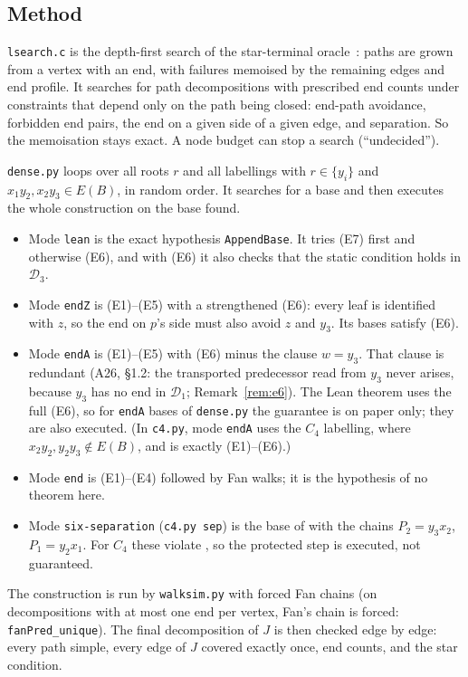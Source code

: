 \documentclass[11pt]{amsart}
\theoremstyle{definition}
\newcommand{\cD}{\mathcal D}
\begin{document}
\subsection*{Method}
\texttt{lsearch.c} is the depth-first search of the star-terminal oracle~\cite{STL,TM}: paths are
grown from a vertex with an end, with failures memoised by the remaining edges and end profile.
It searches for path decompositions with prescribed end counts under constraints that depend only
on the path being closed: end-path avoidance, forbidden end pairs, the end on a given side of a
given edge, and separation. So the memoisation stays exact. A node budget can stop a search
(``undecided'').

\texttt{dense.py} loops over all roots $r$ and all labellings with $r\in\{y_i\}$ and
$x_1y_2,x_2y_3\in E(B)$, in random order. It searches for a base and then executes the whole
construction on the base found.
\begin{itemize}
\item Mode \texttt{lean} is the exact hypothesis \texttt{AppendBase}. It tries (E7) first and
otherwise (E6), and with (E6) it also checks that the static condition holds in $\cD_3$.
\item Mode \texttt{endZ} is (E1)--(E5) with a strengthened (E6): every leaf is identified with
$z$, so the end on $p$'s side must also avoid $z$ and $y_3$. Its bases satisfy (E6).
\item Mode \texttt{endA} is (E1)--(E5) with (E6) minus the clause $w=y_3$. That clause is
redundant (A26, \S1.2: the transported predecessor read from $y_3$ never arises, because $y_3$ has
no end in $\cD_1$; Remark~\ref{rem:e6}). The Lean theorem uses the full (E6), so for
\texttt{endA} bases of \texttt{dense.py} the guarantee is on paper only; they are also executed. (In \texttt{c4.py}, mode \texttt{endA}
uses the $C_4$ labelling, where $x_2y_2,y_2y_3\notin E(B)$, and is exactly (E1)--(E6).)
\item Mode \texttt{end} is (E1)--(E4) followed by Fan walks; it is the hypothesis of no theorem
here.
\item Mode \texttt{six-separation} (\texttt{c4.py sep}) is the base of \cite[Thm~8.2]{TM} with the
chains $P_2=y_3x_2$, $P_1=y_2x_1$. For $C_4$ these violate \cite[Def.~8.1(ii)]{TM}, so the
protected step is executed, not guaranteed.
\end{itemize}
The construction is run by \texttt{walksim.py} with forced Fan chains (on decompositions with at
most one end per vertex, Fan's chain is forced: \texttt{fanPred\_unique}). The final
decomposition of $J$ is then checked edge by edge: every path simple, every edge of $J$ covered
exactly once, end counts, and the star condition.
\end{document}
